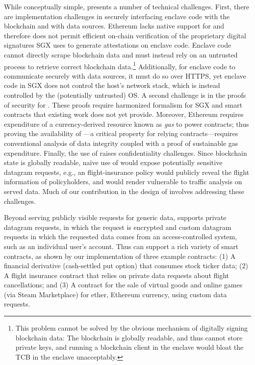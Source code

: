 While conceptually simple, \tc presents a number of technical challenges. First, there are implementation challenges in securely interfacing enclave code with the blockchain and with data sources. Ethereum lacks native support for and therefore does not permit efficient on-chain verification of the proprietary digital signatures SGX uses to generate attestations on enclave code. Enclave code cannot directly scrape blockchain data and must instead rely on an untrusted process to retrieve correct blockchain data.\footnote{This problem cannot be solved by the obvious mechanism of digitally signing blockchain data: The blockchain is globally readable, and thus cannot store private keys, and running a blockchain client in the enclave would bloat the TCB in the enclave unacceptably.} Additionally, for enclave code to communicate securely with data sources, it must do so over HTTPS, yet enclave code in SGX does not control the host's network stack, which is instead controlled by the (potentially untrusted) OS. A second challenge is in the proofs of security for \tc. These proofs require harmonized formalism for SGX and smart contracts that existing work does not yet provide. Moreover, Ethereum requires expenditure of a currency-derived resource known as \emph{gas} to power contracts; thus proving the availability of \tc---a critical property for relying contracts---requires conventional analysis of data integrity coupled with a proof of sustainable gas expenditure. Finally, the use of \tc raises confidentiality challenges. Since blockchain state is globally readable, na\"{i}ve use of \tc would expose potentially sensitive datagram requests, e.g., an flight-insurance policy would publicly reveal the flight information of policyholders, and would render \tc vulnerable to traffic analysis on served data. Much of our contribution in the design of \tc involves addressing these challenges. 

Beyond serving publicly visible requests for generic data, \tc supports private datagram requests, in which the request is encrypted and custom datagram requests in which the requested data comes from an access-controlled system, such as an individual user's account. Thus \tc can support a rich variety of smart contracts, as shown by our implementation of three example contracts: (1) A financial derivative (cash-settled put option) that consumes stock ticker data; (2) A flight insurance contract that relies on private data requests about flight cancellations; and (3) A contract for the sale of virtual goods and online games (via Steam Marketplace) for ether, Ethereum currency, using custom data requests.

